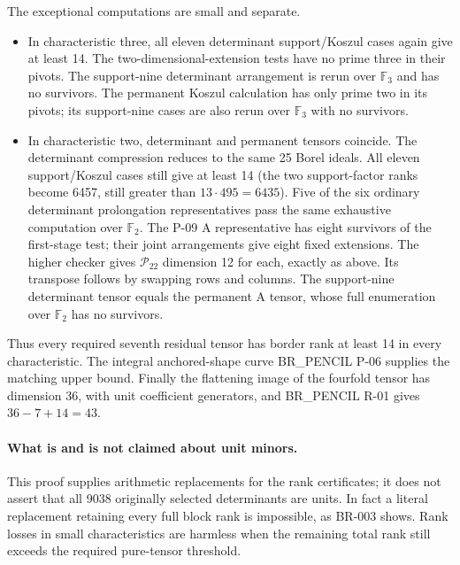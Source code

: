 The exceptional computations are small and separate.
\begin{itemize}
\item In characteristic three, all eleven determinant support/Koszul cases
again give at least 14.  The two-dimensional-extension tests have no prime
three in their pivots.  The support-nine determinant arrangement is rerun
over $\mathbb F_3$ and has no survivors.  The permanent Koszul calculation
has only prime two in its pivots; its support-nine cases are also rerun over
$\mathbb F_3$ with no survivors.
\item In characteristic two, determinant and permanent tensors coincide.
The determinant compression reduces to the same 25 Borel ideals.
All eleven support/Koszul cases still give at least 14 (the two support-factor
ranks become 6457, still greater than $13\cdot495=6435$).
Five of the six ordinary determinant prolongation representatives pass the
same exhaustive computation over $\mathbb F_2$.  The P-09 A representative
has eight survivors of the first-stage test; their joint arrangements give
eight fixed extensions.  The higher checker gives $\mathcal P_{22}$ dimension
12 for each, exactly as above.  Its transpose follows by swapping rows and
columns.  The support-nine determinant tensor equals the permanent A tensor,
whose full enumeration over $\mathbb F_2$ has no survivors.
\end{itemize}
Thus every required seventh residual tensor has border rank at least 14
in every characteristic.  The integral anchored-shape curve BR\_PENCIL P-06
supplies the matching upper bound.  Finally the flattening image of the
fourfold tensor has dimension 36, with unit coefficient generators, and
BR\_PENCIL R-01 gives $36-7+14=43$.

\paragraph{What is and is not claimed about unit minors.}
This proof supplies arithmetic replacements for the rank certificates;
it does not assert that all 9038 originally selected determinants are units.
In fact a literal replacement retaining every full block rank is impossible,
as BR-003 shows.  Rank losses in small characteristics are harmless when the
remaining total rank still exceeds the required pure-tensor threshold.

